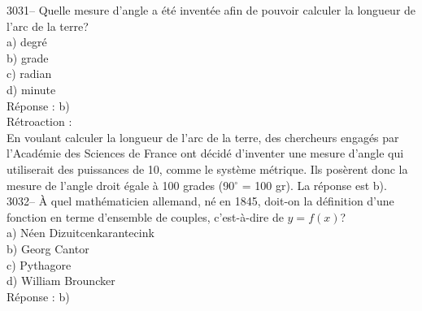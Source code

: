 \documentclass[letterpaper, 12pt]{article}
\begin{document}
3031-- Quelle mesure d'angle a \'et\'e invent\'ee afin de pouvoir calculer la longueur de l'arc de la terre?\\

a) degr\'e\\
b) grade\\
c) radian\\
d) minute\\

R\'eponse : b)\\

R\'etroaction :\\
En voulant calculer la longueur de l'arc de la terre, des chercheurs engag\'es par l'Acad\'emie des Sciences de France ont d\'ecid\'e d'inventer une mesure d'angle qui utiliserait des puissances de 10, comme le syst\`eme m\'etrique. Ils pos\`erent donc la mesure de l'angle droit \'egale \`a 100 grades (90$^\circ$ = 100 gr). La r\'eponse est b).\\



3032-- \`A quel math\'ematicien allemand, n\'e en 1845,  doit-on la d\'efinition d'une fonction en terme d'ensemble de couples, c'est-\`a-dire de $y = f(x)$?\\

a) N\'een Dizuitcenkarantecink\\
b) Georg Cantor\\
c) Pythagore\\
d) William Brouncker\\

R\'eponse : b)\\
\end{document}
